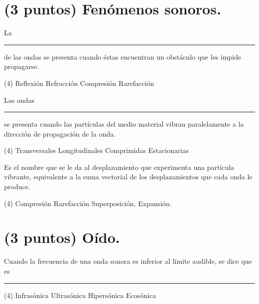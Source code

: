 \documentclass[12pt, letter]{exam}
\begin{document}
\begin{questions}
    \section{(3 puntos) Fenómenos sonoros.}

    \question La \rule{2cm}{0.1mm} de las ondas se presenta cuando éstas encuentran un obstáculo que les impide propagarse.
    \begin{tasks}(4)
        \task Reflexión
        \task Refracción
        \task Compresión
        \task Rarefacción
    \end{tasks}
    \question Las ondas \rule{2cm}{0.1mm} se presenta cuando las partículas del medio material vibran paralelamente a la dirección de propagación de la onda.
    \begin{tasks}(4)
        \task Transversales
        \task Longitudinales
        \task Comprimidas
        \task Estacionarias
    \end{tasks}
    \question Es el nombre que se le da al desplazamiento que experimenta una partícula vibrante, equivalente a la suma vectorial de los desplazamientos que cada onda le produce.
    \begin{tasks}(4)
        \task Compresión
        \task Rarefacción
        \task Superposición.
        \task Expansión.
    \end{tasks}

    \section{(3 puntos) Oído.}

    \question Cuando la frecuencia de una onda sonora es inferior al límite audible, se dice que es \rule{2cm}{0.1mm}
    \begin{tasks}(4)
        \task Infrasónica
        \task Ultrasónica
        \task Hipersónica
        \task Ecosónica
    \end{tasks}
    

\end{questions}
\end{document}
